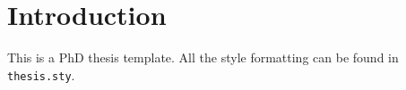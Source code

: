 


%
%

\chapter{Introduction} \label{chap:chap_intro}

This is a PhD thesis template.
All the style formatting can be found in \texttt{thesis.sty}.

